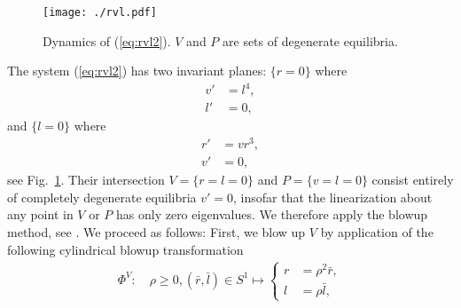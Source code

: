 \documentclass[reqno,12pt]{amsart}
\newcommand{\eqlab}[1]{\label{eq:#1}}
\renewcommand{\eqref}[1]{(\ref{eq:#1})}
\newcommand{\figref}[1]{Fig.~\ref{fig:#1}}
\newcommand{\figlab}[1]{\label{fig:#1}}
\numberwithin{equation}{section}
\begin{document}
\begin{figure}[h!]
 	\begin{center}
 		{\texttt{[image: ./rvl.pdf]}}
 		\caption{Dynamics of \eqref{rvl2}. $V$ and $P$ are sets of degenerate equilibria.}\figlab{rvl}
 	\end{center}
 \end{figure}
 
 
The system \eqref{rvl2} has two invariant planes: $\{r=0\}$ where
\begin{align*}
 v' &=l^4,\\
 l' &=0,
\end{align*}
and $\{l=0\}$ where
\begin{align*}
 r' &=vr^3,\\
 v' &=0,
\end{align*}
see \figref{rvl}. Their intersection $V=\{r=l=0\}$ and $P=\{v=l=0\}$ consist entirely of completely degenerate equilibria $v'=0$, insofar that the linearization about any point in $V$ or $P$ has only zero eigenvalues. We therefore apply the blowup method, see \cite{dumortier2006a,dumortier_1996}. We proceed as follows:
First, we blow up $V$ by application of the following cylindrical blowup transformation 
\begin{align}\eqlab{phiV}
\Phi^V:\quad  \rho\ge 0,(\bar r,\bar l)\in S^1\mapsto \begin{cases}
                                          r &= \rho^2 \bar r,\\
                                          l &=\rho \bar l,
                                         \end{cases}
\end{align}
\end{document}
